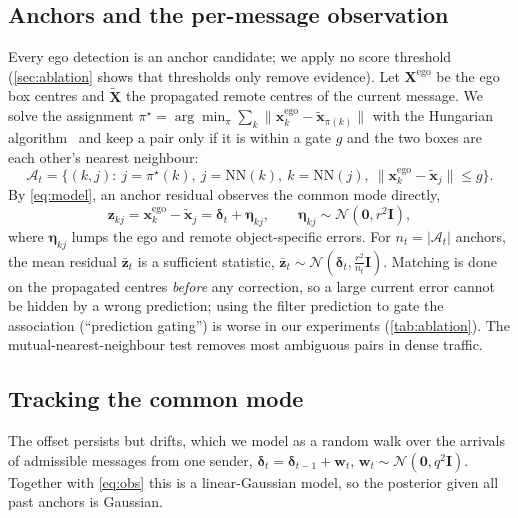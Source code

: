 \subsection{Anchors and the per-message observation}
\label{sec:anchors}
Every ego detection is an anchor candidate; we apply no score threshold (\cref{sec:ablation} shows that thresholds only remove evidence).
Let $\mathbf X^{\text{ego}}$ be the ego box centres and $\tilde{\mathbf X}$ the propagated remote centres of the current message.
We solve the assignment $\pi^\star=\arg\min_\pi\sum_k\|\mathbf x^{\text{ego}}_k-\tilde{\mathbf x}_{\pi(k)}\|$ with the Hungarian algorithm~\cite{kuhn1955hungarian} and keep a pair only if it is within a gate $g$ and the two boxes are each other's nearest neighbour:
\begin{equation}
  \mathcal A_t=\big\{(k,j):\ j=\pi^\star(k),\ j=\mathrm{NN}(k),\ k=\mathrm{NN}(j),\ \|\mathbf x^{\text{ego}}_k-\tilde{\mathbf x}_j\|\le g\big\}.
  \label{eq:anchors}
\end{equation}
By \cref{eq:model}, an anchor residual observes the common mode directly,
\begin{equation}
  \mathbf z_{kj}=\mathbf x^{\text{ego}}_k-\tilde{\mathbf x}_j=\boldsymbol\delta_t+\boldsymbol\eta_{kj},\qquad\boldsymbol\eta_{kj}\sim\mathcal N(\mathbf 0,r^2\mathbf I),
  \label{eq:obs}
\end{equation}
where $\boldsymbol\eta_{kj}$ lumps the ego and remote object-specific errors.
For $n_t=|\mathcal A_t|$ anchors, the mean residual $\bar{\mathbf z}_t$ is a sufficient statistic, $\bar{\mathbf z}_t\sim\mathcal N(\boldsymbol\delta_t,\tfrac{r^2}{n_t}\mathbf I)$.
Matching is done on the propagated centres \emph{before} any correction, so a large current error cannot be hidden by a wrong prediction; using the filter prediction to gate the association (``prediction gating'') is worse in our experiments (\cref{tab:ablation}).
The mutual-nearest-neighbour test removes most ambiguous pairs in dense traffic.

\subsection{Tracking the common mode}
\label{sec:kf}
The offset persists but drifts, which we model as a random walk over the arrivals of admissible messages from one sender, $\boldsymbol\delta_t=\boldsymbol\delta_{t-1}+\mathbf w_t$, $\mathbf w_t\sim\mathcal N(\mathbf 0,q^2\mathbf I)$.
Together with \cref{eq:obs} this is a linear-Gaussian model, so the posterior given all past anchors is Gaussian.

